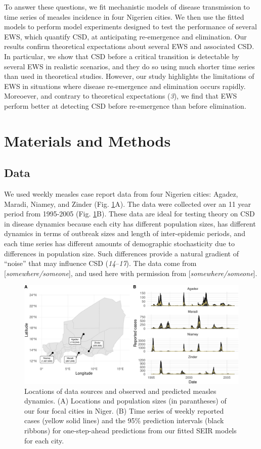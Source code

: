 \documentclass[3p]{elsarticle} %
\makeatletter
\def\maxwidth{\ifdim\Gin@nat@width>\linewidth\linewidth
\else\Gin@nat@width\fi}
\let\Oldincludegraphics\includegraphics
\renewcommand{\includegraphics}[1]{\Oldincludegraphics[width=\maxwidth]{#1}}
\makeatother
\begin{document}
To answer these questions, we fit mechanistic models of disease
transmission to time series of measles incidence in four Nigerien
cities. We then use the fitted models to perform model experiments
designed to test the performance of several EWS, which quantify CSD, at
anticipating re-emergence and elimination. Our results confirm
theoretical expectations about several EWS and associated CSD. In
particular, we show that CSD before a critical transition is detectable
by several EWS in realistic scenarios, and they do so using much shorter
time series than used in theoretical studies. However, our study
highlights the limitations of EWS in situations where disease
re-emergence and elimination occurs rapidly. Moreoever, and contrary to
theoretical expectations (\emph{3}), we find that EWS perform better at
detecting CSD before re-emergence than before elimination.

\section{Materials and Methods}\label{materials-and-methods}

\subsection{Data}\label{data}

We used weekly measles case report data from four Nigerien cities:
Agadez, Maradi, Niamey, and Zinder (Fig. \ref{data}A). The data were
collected over an 11 year period from 1995-2005 (Fig. \ref{data}B).
These data are ideal for testing theory on CSD in disease dynamics
because each city has different population sizes, has different dynamics
in terms of outbreak sizes and length of inter-epidemic periods, and
each time series has different amounts of demographic stochasticity due
to differences in population size. Such differences provide a natural
gradient of ``noise'' that may influence CSD (\emph{14}--\emph{17}). The
data come from {[}\emph{somewhere/someone}{]}, and used here with
permission from {[}\emph{somewhere/someone}{]}.

\begin{figure}
\centering
\includegraphics{ms2_files/figure-latex/data-1.pdf}
\caption{Locations of data sources and observed and predicted measles
dynamics. (A) Locations and population sizes (in parantheses) of our
four focal cities in Niger. (B) Time series of weekly reported cases
(yellow solid lines) and the 95\% prediction intervals (black ribbons)
for one-step-ahead predictions from our fitted SEIR models for each
city. \label{data}}
\end{figure}
\end{document}
